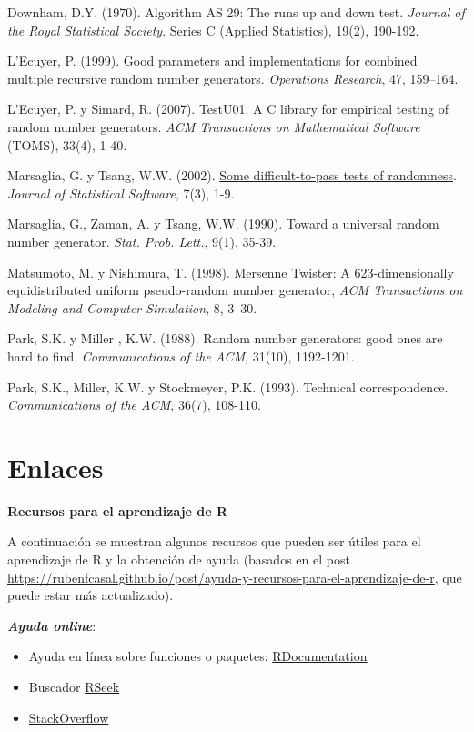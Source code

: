 \documentclass[
]{book}
\theoremstyle{break}
\theoremstyle{definition}
\theoremstyle{definition}
\theoremstyle{definition}
\theoremstyle{remark}
\begin{document}
Downham, D.Y. (1970). Algorithm AS 29: The runs up and down test. \emph{Journal of the Royal Statistical Society}. Series C (Applied Statistics), 19(2), 190-192.

L'Ecuyer, P. (1999). Good parameters and implementations for combined multiple recursive random number generators. \emph{Operations Research}, 47, 159--164.

L'Ecuyer, P. y Simard, R. (2007). TestU01: A C library for empirical testing of random number generators. \emph{ACM Transactions on Mathematical Software} (TOMS), 33(4), 1-40.

Marsaglia, G. y Tsang, W.W. (2002). \href{http://www.jstatsoft.org/v07/i03}{Some difficult-to-pass tests of randomness}. \emph{Journal of Statistical Software}, 7(3), 1-9.

Marsaglia, G., Zaman, A. y Tsang, W.W. (1990). Toward a universal random number generator. \emph{Stat. Prob. Lett.}, 9(1), 35-39.

Matsumoto, M. y Nishimura, T. (1998). Mersenne Twister: A 623-dimensionally equidistributed uniform pseudo-random number generator, \emph{ACM Transactions on Modeling and Computer Simulation}, 8, 3--30.

Park, S.K. y Miller , K.W. (1988). Random number generators: good ones are hard to find. \emph{Communications of the ACM}, 31(10), 1192-1201.

Park, S.K., Miller, K.W. y Stockmeyer, P.K. (1993). Technical correspondence. \emph{Communications of the ACM}, 36(7), 108-110.

\hypertarget{appendix-apendices}{%
\appendix}


\hypertarget{links}{%
\chapter{Enlaces}\label{links}}

\textbf{Recursos para el aprendizaje de R}

A continuación se muestran algunos recursos que pueden ser útiles para el aprendizaje de R y la obtención de ayuda
(basados en el post \url{https://rubenfcasal.github.io/post/ayuda-y-recursos-para-el-aprendizaje-de-r},
que puede estar más actualizado).

\textbf{\emph{Ayuda online}}:

\begin{itemize}
\item
  Ayuda en línea sobre funciones o paquetes: \href{https://www.rdocumentation.org/}{RDocumentation}
\item
  Buscador \href{http://rseek.org/}{RSeek}
\item
  \href{http://stackoverflow.com/questions/tagged/r}{StackOverflow}
\end{itemize}
\end{document}
